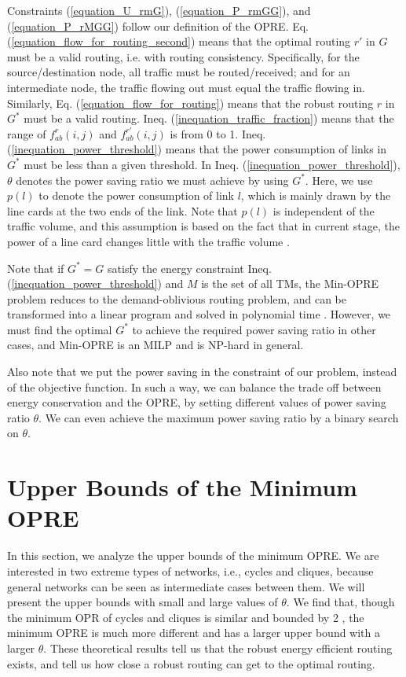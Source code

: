\documentclass[conference]{IEEEtran}
\begin{document}
Constraints (\ref{equation_U_rmG}), (\ref{equation_P_rmGG}), and (\ref{equation_P_rMGG}) follow our definition of the OPRE. Eq. (\ref{equation_flow_for_routing_second}) means that the optimal routing $r'$ in $G$ must be a valid routing, i.e. with routing consistency. Specifically, for the source/destination node, all traffic must be routed/received; and for an intermediate node, the traffic flowing out must equal the traffic flowing in. Similarly, Eq. (\ref{equation_flow_for_routing}) means that the robust routing $r$ in $G^*$ must be a valid routing. Ineq. (\ref{inequation_traffic_fraction}) means that the range of $f^r_{ab}(i,j)$ and $f^{r'}_{ab}(i,j)$ is from 0 to 1. Ineq. (\ref{inequation_power_threshold}) means that the power consumption of links in $G^*$ must be less than a given threshold. In Ineq. (\ref{inequation_power_threshold}), $\theta$ denotes the power saving ratio we must achieve by using $G^*$. Here, we use $p(l)$ to denote the power consumption of link $l$, which is mainly drawn by the line cards at the two ends of the link. Note that $p(l)$ is independent of the traffic volume, and this assumption is based on the fact that in current stage, the power of a line card changes little with the traffic volume \cite{PowerAware08Infocom}.

Note that if $G^* = G$ satisfy the energy constraint Ineq. (\ref{inequation_power_threshold}) and $M$ is the set of all TMs, the Min-OPRE problem reduces to the demand-oblivious routing problem, and can be transformed into a linear program and solved in polynomial time \cite{networking:oblivious}. However, we must find the optimal $G^*$ to achieve the required power saving ratio in other cases, and Min-OPRE is an MILP and is NP-hard in general.

Also note that we put the power saving in the constraint of our problem, instead of the objective function. In such a way, we can balance the trade off between energy conservation and the OPRE, by setting different values of power saving ratio $\theta$. We can even achieve the maximum power saving ratio by a binary search on $\theta$.

\section{Upper Bounds of the Minimum OPRE}
\label{upper_bounds_of_the_minimum_opre}

In this section, we analyze the upper bounds of the minimum OPRE. We are interested in two extreme types of networks, i.e., cycles and cliques, because general networks can be seen as intermediate cases between them. We will present the upper bounds with small and large values of $\theta$. We find that, though the minimum OPR of cycles and cliques is similar and bounded by 2 \cite{networking:oblivious}, the minimum OPRE is much more different and has a larger upper bound with a larger $\theta$. These theoretical results tell us that the robust energy efficient routing exists, and tell us how close a robust routing can get to the optimal routing.
\end{document}
